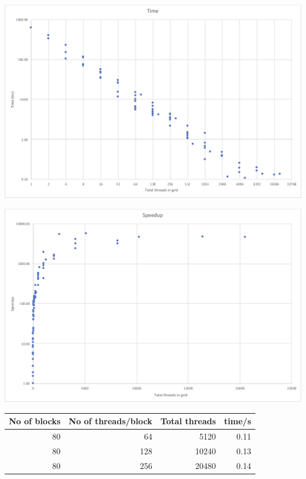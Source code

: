 \documentclass[a4paper,12pt]{article}
\begin{document}
\begin{center}
  \includegraphics[width=\linewidth]{xgpc-time}
  \label{figure:xgpctime}
\end{center}

\begin{center}
  \includegraphics[width=\linewidth]{xgpc-speedup}
\end{center}

\begin{center}
  \begin{tabular}{r r | r | r}
    No of blocks & No of threads/block & Total threads & time/s \\ \hline
    80 & 64 & 5120 & 0.11 \\
    80 & 128 & 10240 & 0.13 \\
    80 & 256 & 20480 & 0.14 \\
  \end{tabular}
  \label{table:xgpcperf}
\end{center}
\end{document}
